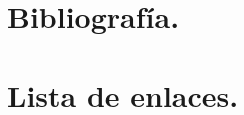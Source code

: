 \documentclass[10pt,a4paper]{book}
\begin{document}
%

\section{Bibliografía.}\label{bibliografia}


\section{Lista de enlaces.}



\printindex


\newpage
\end{document}
